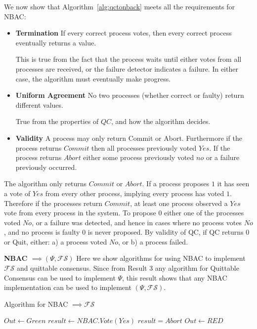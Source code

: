 We now show that Algorithm~\ref{alg:qctonback} meets all the requirements for NBAC:
\begin{itemize}
\item \textbf{Termination} If every correct process votes, then every correct process eventually returns a value.

This is true from the fact that the process waits until either votes from all processes are received, or the failure
detector indicates a failure. In either case, the algorithm must eventually make progress.

\item \textbf{Uniform Agreement} No two processes (whether correct or faulty) return different values.

True from the properties of $QC$, and how the algorithm decides.

\item \textbf{Validity} A process may only return Commit or Abort. Furthermore if the process returns $Commit$ then all
processes previously voted $Yes$. If the process returns $Abort$ either some process previously voted $no$ or a failure
previously occurred.
\end{itemize}

The algorithm only returns $Commit$ or $Abort$. If a process proposes $1$ it has seen a vote of $Yes$ from every other
process, implying every process has voted $1$. Therefore if the processes return $Commit$, at least one process
observed a $Yes$ vote from every process in the system. To propose $0$ either one of the processes voted $No$, or a
failure was detected, and hence in cases where no process votes $No$, and no process is faulty $0$ is never proposed. By
validity of QC, if QC returns $0$ or Quit, either: a) a process voted $No$, or b) a process failed.

\textbf{NBAC $\implies (\Psi, \mathcal{FS})$} Here we show algorithms for using NBAC to implement $\mathcal{FS}$ and quittable
consensus. Since from Result 3 any algorithm for Quittable Consensus can be used to implement $\Psi$, this result shows
that any NBAC implementation can be used to implement $(\Psi, \mathcal{FS})$.

\begin{algorithm}
\caption{Algorithm for NBAC $\implies \mathcal{FS}$}
\label{alg:nbactofs}
\begin{algorithmic}[1]
    \State $Out \gets Green$ 
     
        \State $result \gets NBAC.Vote(Yes)$
        \If $result = Abort$
            \State $Out \gets RED$
        \EndIf
    \EndWhile
\EndProcedure
\end{algorithmic}
\end{algorithm}

